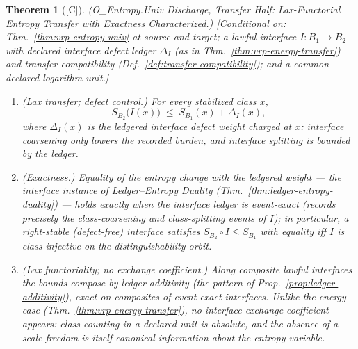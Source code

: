 \documentclass[12pt,oneside]{amsbook}
\theoremstyle{plain}
\newtheorem{theorem}{Theorem}[section]
\theoremstyle{definition}
\theoremstyle{remark}
\newcommand{\status}[1]{\textup{[#1]}}
\begin{document}
\begin{theorem}[\status{C}]\label{thm:vrp-entropy-transfer}
\textup{(O\_Entropy.Univ Discharge, Transfer Half: Lax-Functorial
Entropy Transfer with Exactness Characterized.)}
\textup{[Conditional on: Thm.~\ref{thm:vrp-entropy-univ} at source
and target; a lawful interface $I : B_1 \to B_2$ with declared
interface defect ledger $\Delta_I$ (as in
Thm.~\ref{thm:vrp-energy-transfer}) and transfer-compatibility
(Def.~\ref{def:transfer-compatibility}); and a common declared
logarithm unit.]}
\begin{enumerate}[label=\textup{(\arabic*)}]
  \item \emph{(Lax transfer; defect control.)}  For every
    stabilized class $x$,
    \[
      S_{B_2}\bigl(I(x)\bigr) \;\le\; S_{B_1}(x) + \Delta_I(x),
    \]
    where $\Delta_I(x)$ is the ledgered interface defect weight
    charged at $x$: interface coarsening only lowers the recorded
    burden, and interface splitting is bounded by the ledger.
  \item \emph{(Exactness.)}  Equality of the entropy change with
    the ledgered weight --- the interface instance of
    Ledger--Entropy Duality
    (Thm.~\ref{thm:ledger-entropy-duality}) --- holds exactly when
    the interface ledger is event-exact (records precisely the
    class-coarsening and class-splitting events of $I$); in
    particular, a right-stable (defect-free) interface satisfies
    $S_{B_2} \circ I \le S_{B_1}$ with equality iff $I$ is
    class-injective on the distinguishability orbit.
  \item \emph{(Lax functoriality; no exchange coefficient.)}
    Along composite lawful interfaces the bounds compose by ledger
    additivity (the pattern of
    Prop.~\ref{prop:ledger-additivity}), exact on composites of
    event-exact interfaces.  Unlike the energy case
    (Thm.~\ref{thm:vrp-energy-transfer}), \emph{no interface
    exchange coefficient appears}: class counting in a declared
    unit is absolute, and the absence of a scale freedom is itself
    canonical information about the entropy variable.
\end{enumerate}
\end{theorem}
\end{document}
